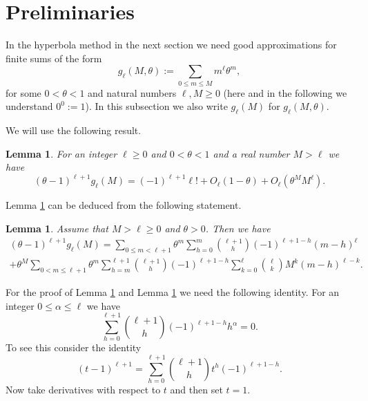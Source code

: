 \documentclass[JEP,XML,SOM,Unicode,published]{cedram}
\let\tet\theta
\newtheorem{lemma}[theorem]{Lemma}
\theoremstyle{definition}
\numberwithin{theorem}{section}
\begin{document}
\section{Preliminaries}
\label{sec:preliminaries}

In the hyperbola method in the next section we need good approximations for finite sums of the form
\[
g_\ell (M,\tet):=\sum_{0\leq m\leq M} m^\ell \tet^m,
\]
for some $0<\tet <1$ and natural numbers $\ell,M\geq 0$ (here and in the following we understand $0^0:=1$).
In this subsection we also write $g_\ell(M)$ for $g_\ell(M,\tet)$.

We will use the following result.

\begin{lemma}\label{lemgl2}
For an integer $\ell\geq 0$ and $0<\tet < 1$ and a real number $M>\ell$ we have
\[
(\tet -1)^{\ell+1}g_\ell(M)=(-1)^{\ell+1} \ell! +O_\ell(1-\tet)+O_\ell (\tet^M M^\ell).
\]
\end{lemma}

Lemma \ref{lemgl2} can be deduced from the following statement.

\begin{lemma}\label{lemgl}
Assume that $M>\ell\geq 0$ and $\tet >0$. Then we have
\begin{multline*}
(\tet -1)^{\ell+1}g_\ell(M)= \sum_{0\leq m<\ell+1}\tet^m \sum_{h=0}^m \binom{\ell+1}{h}(-1)^{\ell+1-h}(m-h)^\ell \\
+ \tet^M \sum_{0<m\leq \ell+1}\tet^m \sum_{h=m}^{\ell+1}\binom{\ell+1}{h}(-1)^{\ell+1-h}\sum_{k=0}^\ell \binom{\ell}{k} M^k (m-h)^{\ell-k}.
\end{multline*}
\end{lemma}

For the proof of Lemma \ref{lemgl} and Lemma \ref{lemgl2} we need the following identity. For an integer $0\leq \alpha\leq \ell$ we have
\begin{equation}\label{eqnbinom}
\sum_{h=0}^{\ell+1}\binom{\ell+1}{h} (-1)^{\ell+1-h}h^\alpha =0.
\end{equation}
To see this consider the identity
\[
(t-1)^{\ell+1}=\sum_{h=0}^{\ell+1}\binom{\ell+1}{h} t^h (-1)^{\ell+1-h}.
\]
Now take derivatives with respect to $t$ and then set $t=1$.\par
\end{document}
